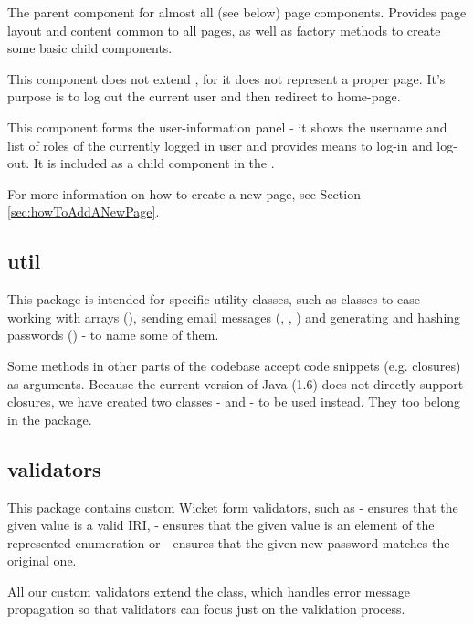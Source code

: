 \begin{description}[style=nextline,font=\ttfamily]
	\item[FrontendPage] The parent component for almost all (see below) page components. Provides page layout and content common to all pages, as well as factory methods to create some basic child components.
	\item[LogoutPage] This component does not extend , for it does not represent a proper page. It's purpose is to log out the current user and then redirect to home-page.
	\item[UserPanel] This component forms the user-information panel - it shows the username and list of roles of the currently logged in user and provides means to log-in and log-out. It is included as a child component in the .
\end{description}
	
For more information on how to create a new page, see Section \ref{sec:howToAddANewPage}.

\subsection{util}

This package is intended for \FE specific utility classes, such as classes to ease working with arrays (), sending email messages (, , ) and generating and hashing passwords () - to name some of them.

Some methods in other parts of the \FE codebase accept code snippets (e.g. closures) as arguments. Because the current version of Java (1.6) does not directly support closures, we have created two classes -  and  - to be used instead. They too belong in the  package.

\subsection{validators}

This package contains custom Wicket form validators, such as  - ensures that the given value is a valid IRI,  - ensures that the given value is an element of the represented enumeration or  - ensures that the given new password matches the original one.

All our custom validators extend the  class, which handles error message propagation so that validators can focus just on the validation process.

